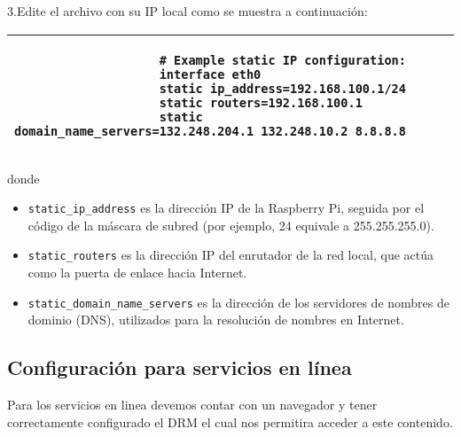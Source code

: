 \documentclass[report,12pt]{article}
\begin{document}
\begin{enumerate}[label=\alph*.]
	\vspace{-1cm}
		3.Edite el archivo con su IP local como se muestra a continuación:
		
		\vspace{-1cm}
			\begin{table}[h]
			\centering
			\small %
			\color{gray} %
			\begin{tabular}{|p{\linewidth}|}
				\hline
				\begin{verbatim}
					# Example static IP configuration:
					interface eth0
					static ip_address=192.168.100.1/24
					static routers=192.168.100.1
					static domain_name_servers=132.248.204.1 132.248.10.2 8.8.8.8
				\end{verbatim}
				\\
				\hline
			\end{tabular}
		\end{table} 
		\vspace{-1cm}
		
		\newpage
	donde
		\begin{itemize}
			\item \texttt{static\_ip\_address} es la dirección IP de la Raspberry Pi, seguida por el código de la máscara de subred (por ejemplo, 24 equivale a 255.255.255.0).
			\item \texttt{static\_routers} es la dirección IP del enrutador de la red local, que actúa como la puerta de enlace hacia Internet.
			\item \texttt{static\_domain\_name\_servers} es la dirección de los servidores de nombres de dominio (DNS), utilizados para la resolución de nombres en Internet.
		\end{itemize}
		
	\end{enumerate}
	

	\subsection{Configuración para servicios en línea}
	Para los servicios en linea devemos contar con un navegador y tener correctamente configurado el DRM el cual nos permitira acceder a este contenido. 
	
\end{document}
